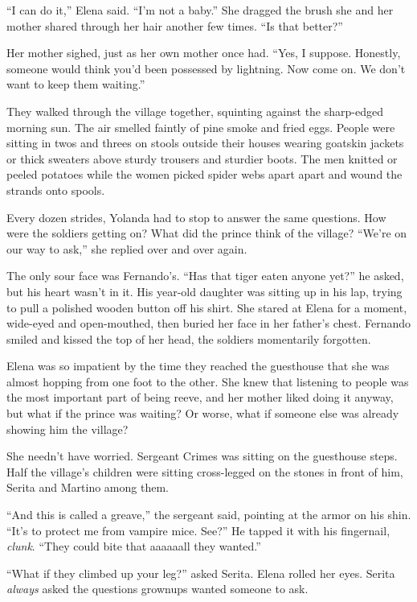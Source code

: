\documentclass[10pt]{book}
\begin{document}
``I can do it,'' Elena said. ``I'm not a baby.'' She dragged the brush she and her mother shared through her hair another few times. ``Is that better?''

Her mother sighed, just as her own mother once had. ``Yes, I suppose. Honestly, someone would think you'd been possessed by lightning. Now come on. We don't want to keep them waiting.''

They walked through the village together, squinting against the sharp-edged morning sun. The air smelled faintly of pine smoke and fried eggs. People were sitting in twos and threes on stools outside their houses wearing goatskin jackets or thick sweaters above sturdy trousers and sturdier boots. The men knitted or peeled potatoes while the women picked spider webs apart apart and wound the strands onto spools.

Every dozen strides, Yolanda had to stop to answer the same questions. How were the soldiers getting on? What did the prince think of the village? ``We're on our way to ask,'' she replied over and over again.

The only sour face was Fernando's. ``Has that tiger eaten anyone yet?'' he asked, but his heart wasn't in it. His year-old daughter was sitting up in his lap, trying to pull a polished wooden button off his shirt. She stared at Elena for a moment, wide-eyed and open-mouthed, then buried her face in her father's chest. Fernando smiled and kissed the top of her head, the soldiers momentarily forgotten.

Elena was so impatient by the time they reached the guesthouse that she was almost hopping from one foot to the other. She knew that listening to people was the most important part of being reeve, and her mother liked doing it anyway, but what if the prince was waiting? Or worse, what if someone else was already showing him the village?

She needn't have worried. Sergeant Crimes was sitting on the guesthouse steps. Half the village's children were sitting cross-legged on the stones in front of him, Serita and Martino among them.

``And this is called a greave,'' the sergeant said, pointing at the armor on his shin. ``It's to protect me from vampire mice. See?'' He tapped it with his fingernail, \emph{clunk}. ``They could bite that aaaaaall they wanted.''

``What if they climbed up your leg?'' asked Serita. Elena rolled her eyes. Serita \emph{always} asked the questions grownups wanted someone to ask.
\end{document}
